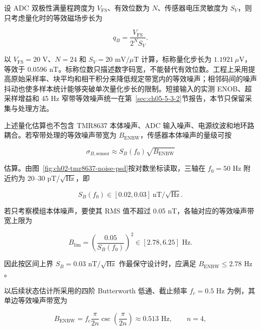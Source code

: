 设 ADC 双极性满量程跨度为 \(V_{\mathrm{FS}}\)、有效位数为 \(N\)、传感器电压灵敏度为 \(S_V\)，则只考虑量化时的等效磁场步长为

\begin{equation}
q_B = \frac{V_{\mathrm{FS}}}{2^N S_V}.
\label{eq:ch02-quant-step}
\end{equation}

以 \(V_{\mathrm{FS}}=20\text{ V}\)、\(N=24\) 和 \(S_V=20\text{ mV}/\mu\text{T}\) 计算，标称量化步长为 \(1.1921\ \mu\text{V}\)，等效于 \(0.0596\text{ nT}\)。标称位数只描述数字码宽，不能替代有效位数。工程上采用提高原始采样率、块平均和相干积分来降低规定带宽内的等效噪声；相邻码间的噪声抖动也使多样本统计能够突破单次量化步长的限制。短接输入的实测 ENOB、超采样增益和 45 Hz 窄带等效噪声统一在第~\ref{sec:ch05-5-3-2}节报告，本节只保留采集与处理方法。

上述量化估算也不包含 TMR8637 本体噪声、ADC 输入噪声、电源纹波和地环路耦合。若窄带处理的等效噪声带宽为 \(B_{\mathrm{ENBW}}\)，传感器本体噪声的量级可按

\begin{equation}
\sigma_{B,\mathrm{sensor}} \approx S_B(f_0)\sqrt{B_{\mathrm{ENBW}}}
\label{eq:ch02-sensor-noise}
\end{equation}

估算。由图~\ref{fig:ch02-tmr8637-noise-psd}按对数坐标读取，三轴在 \(f_0=50\text{ Hz}\) 附近约为 20--30 pT/\(\sqrt{\text{Hz}}\)，即

\begin{equation}
S_B(f_0)\in[0.02,0.03]\ \text{nT}/\sqrt{\text{Hz}}.
\label{eq:ch02-psd-range}
\end{equation}

若只考察模组本体噪声，要使其 RMS 值不超过 0.05 nT，各轴对应的等效噪声带宽上限为

\begin{equation}
B_{\mathrm{lim}}=\left(\frac{0.05}{S_B(f_0)}\right)^2\in[2.78,6.25]\text{ Hz}.
\label{eq:ch02-enbw-limit}
\end{equation}

因此按区间上界 \(S_B=0.03\text{ nT}/\sqrt{\text{Hz}}\) 作最保守设计时，应满足 \(B_{\mathrm{ENBW}}\leq2.78\text{ Hz}\)。

以后续状态估计所采用的四阶 Butterworth 低通、截止频率 \(f_c=0.5\text{ Hz}\) 为例，其单边等效噪声带宽为

\begin{equation}
B_{\mathrm{ENBW}}=f_c\frac{\pi}{2n}\csc\left(\frac{\pi}{2n}\right)\approx0.513\text{ Hz},\qquad n=4,
\label{eq:ch02-butterworth-enbw}
\end{equation}

